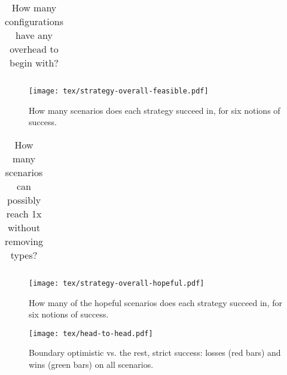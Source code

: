 \documentclass{article}
\begin{document}
\begin{table}[ht]\centering
  \caption{How many configurations have any overhead to begin with?}
  \label{t:baseline-trouble}
  \begin{tabular}{lrr}
    
  \end{tabular}
\end{table}

\begin{figure}[ht]
  \texttt{[image: tex/strategy-overall-feasible.pdf]}
  \caption{How many scenarios does each strategy succeed in, for six notions of success.}
  \label{f:strategy-overall}
\end{figure}

\begin{table}[ht]\centering
  \caption{How many scenarios can possibly reach 1x without removing types?}
  \label{t:blackhole}
  \begin{tabular}{lrr}
    
  \end{tabular}
\end{table}

\begin{figure}[ht]
  \texttt{[image: tex/strategy-overall-hopeful.pdf]}
  \caption{How many of the hopeful scenarios does each strategy succeed in, for six notions of success.}
  \label{f:strategy-hope}
\end{figure}

\begin{figure}[ht]
  \texttt{[image: tex/head-to-head.pdf]} %
  \caption{Boundary optimistic vs. the rest, strict success: losses (red bars) and wins (green bars) on all scenarios.}
  \label{f:head-to-head}
\end{figure}
\end{document}
